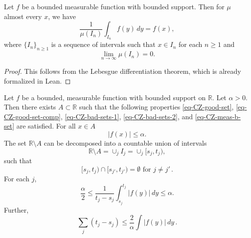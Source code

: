 \begin{lemma}
    \label{Lebesgue-differentiation}
    Let $f$ be a bounded measurable function with bounded support. Then for $\mu$ almost every $x$, we have
    $$\frac{1}{\mu(I_n)}\int_{I_n} f(y)\, dy= f(x),$$
    where $\{I_n\}_{n\geq 1}$ is a sequence of intervals such that $x\in I_n$ for each $n\geq 1$ and $$\lim_{n\to \infty} \mu(I_n)=0.$$
\end{lemma}
\begin{proof}
    This follows from the Lebesgue differentiation theorem, which is already formalized in Lean.
\end{proof}

\begin{lemma}
   \label{stopping-time}
   Let $f$ be a bounded, measurable function with bounded support on $\mathbb{R}$. Let $\alpha>0$. Then there exists $A\subset \mathbb{R}$ such that the following properties \eqref{eq-CZ-good-set}, \eqref{eq-CZ-good-set-comp}, \eqref{eq-CZ-bad-sets-1}, \eqref{eq-CZ-bad-sets-2}, and \eqref{eq-CZ-meas-b-set} are satisfied. For all $x\in A$
    \begin{equation}
    \label{eq-CZ-good-set}
        |f(x)|\leq \alpha.
    \end{equation}
    The set $\mathbb{R}\setminus A$ can be decomposed into a countable union of intervals
    \begin{equation}
        \label{eq-CZ-good-set-comp}
        \mathbb{R}\setminus A= \cup_{j} I_j= \cup_{j} [s_j, t_j),
    \end{equation}
    such that
   \begin{equation}
   \label{eq-CZ-bad-sets-1}
    [s_j, t_j)\cap [s_{j'}, t_{j'})=\emptyset \text{ for } j\neq j' \,.
   \end{equation}
   For each $j$,
   \begin{equation}
       \label{eq-CZ-bad-sets-2}
       \frac{\alpha}{2}\leq \frac{1}{t_j-s_j}\int_{s_j}^{t_j} |f(y)|\, dy\leq \alpha.
   \end{equation}
   Further,
   \begin{equation}
       \label{eq-CZ-meas-b-set}
        \sum_{j}(t_j-s_j)\leq \frac{2}{\alpha}\int |f(y)|\, dy\,.
   \end{equation}
\end{lemma}
